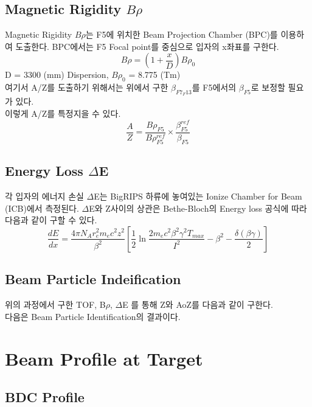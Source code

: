 \subsection{Magnetic Rigidity $B\rho$}
Magnetic Rigidity $B\rho$는 F5에 위치한 Beam Projection Chamber (BPC)를 이용하여 도출한다. 
BPC에서는 F5 Focal point를 중심으로 입자의 x좌표를 구한다. 
\begin{displaymath}
    B\rho = (1+\frac{x}{D}) B\rho_{0}
\end{displaymath}
D = 3300 (mm) Dispersion, $B\rho_{0}$ = 8.775 (Tm) \\
여기서 A/Z를 도출하기 위해서는 위에서 구한 $\beta_{F7_F13}$를 F5에서의 $\beta_{F5}$로 보정할 필요가 있다. \\
\indent 이렇게 A/Z를 특정지을 수 있다.
\begin{displaymath}
    \frac{A}{Z} = \frac{B\rho_{F5}}{B\rho_{F5}^{ref}} \times \frac{\beta_{F5}^{ref}}{\beta_{F5}}
\end{displaymath}

\subsection{Energy Loss $\Delta$E}
각 입자의 에너지 손실 $\Delta$E는 BigRIPS 하류에 놓여있는 Ionize Chamber for Beam (ICB)에서 측정된다. $\Delta$E와 Z사이의 상관은 Bethe-Bloch의 Energy loss 공식에 따라 다음과 같이 구할 수 있다.
\begin{displaymath}
    \frac{dE}{dx} = \frac{4\pi N_{A} r_{e}^{2} m_{e} c^{2} z^{2}}{\beta^{2}} \left[ \frac{1}{2} \ln \frac{2m_{e}c^{2}\beta^{2}\gamma^{2}T_{max}}{I^{2}} - \beta^{2} - \frac{\delta(\beta\gamma)}{2} \right]
\end{displaymath}

\subsection{Beam Particle Indeification}
위의 과정에서 구한 TOF, B$\rho$, $\Delta$E 를 통해 Z와 AoZ를 다음과 같이 구한다. \\

다음은 Beam Particle Identification의 결과이다. 

\section{Beam Profile at Target}
\subsection{BDC Profile}
